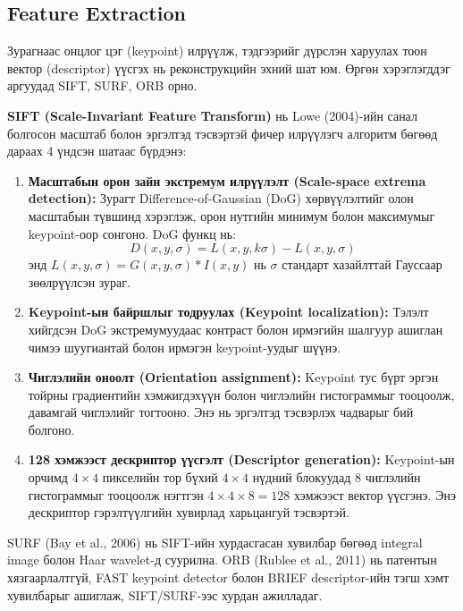 \subsection{Feature Extraction}

Зурагнаас онцлог цэг (keypoint) илрүүлж, тэдгээрийг дүрслэн харуулах тоон вектор (descriptor) үүсгэх нь реконструкцийн эхний шат юм. Өргөн хэрэглэгддэг аргуудад SIFT, SURF, ORB орно.

\textbf{SIFT (Scale-Invariant Feature Transform)} нь Lowe (2004)-ийн санал болгосон масштаб болон эргэлтэд тэсвэртэй фичер илрүүлэгч алгоритм бөгөөд дараах 4 үндсэн шатаас бүрдэнэ:

\begin{enumerate}
    \item \textbf{Масштабын орон зайн экстремум илрүүлэлт (Scale-space extrema detection):} Зурагт Difference-of-Gaussian (DoG) хөрвүүлэлтийг олон масштабын түвшинд хэрэглэж, орон нутгийн минимум болон максимумыг keypoint-оор сонгоно. DoG функц нь:
    \[
        D(x,y,\sigma) = L(x,y,k\sigma) - L(x,y,\sigma)
    \]
    энд $L(x,y,\sigma) = G(x,y,\sigma)*I(x,y)$ нь $\sigma$ стандарт хазайлттай Гауссаар зөөлрүүлсэн зураг.

    \item \textbf{Keypoint-ын байршлыг тодруулах (Keypoint localization):} Тэлэлт хийгдсэн DoG экстремумуудаас контраст болон ирмэгийн шалгуур ашиглан чимээ шуугиантай болон ирмэгэн keypoint-уудыг шүүнэ.

    \item \textbf{Чиглэлийн оноолт (Orientation assignment):} Keypoint тус бүрт эргэн тойрны градиентийн хэмжигдэхүүн болон чиглэлийн гистограммыг тооцоолж, давамгай чиглэлийг тогтооно. Энэ нь эргэлтэд тэсвэрлэх чадварыг бий болгоно.

    \item \textbf{128 хэмжээст дескриптор үүсгэлт (Descriptor generation):} Keypoint-ын орчимд $4\times4$ пикселийн тор бүхий $4\times4$ нүдний блокуудад 8 чиглэлийн гистограммыг тооцоолж нэгтгэн $4\times4\times8=128$ хэмжээст вектор үүсгэнэ. Энэ дескриптор гэрэлтүүлгийн хувирлад харьцангуй тэсвэртэй.
\end{enumerate}

SURF (Bay et al., 2006) нь SIFT-ийн хурдасгасан хувилбар бөгөөд integral image болон Haar wavelet-д суурилна. ORB (Rublee et al., 2011) нь патентын хязгаарлалтгүй, FAST keypoint detector болон BRIEF descriptor-ийн тэгш хэмт хувилбарыг ашиглаж, SIFT/SURF-ээс хурдан ажилладаг.

